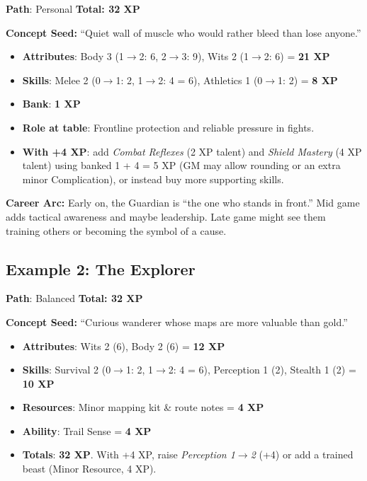 \textbf{Path}: Personal \quad \textbf{Total: 32 XP}

\medskip

\noindent\textbf{Concept Seed:} ``Quiet wall of muscle who would rather bleed than lose anyone.''

\begin{itemize}
\item \textbf{Attributes}: Body 3 (1\(\to\)2: 6, 2\(\to\)3: 9), Wits 2 (1\(\to\)2: 6) = \textbf{21 XP}
\item \textbf{Skills}: Melee 2 (0\(\to\)1: 2, 1\(\to\)2: 4 = 6), Athletics 1 (0\(\to\)1: 2) = \textbf{8 XP}
\item \textbf{Bank}: \textbf{1 XP}
\item \textbf{Role at table}: Frontline protection and reliable pressure in fights.
\item \textbf{With +4 XP}: add \emph{Combat Reflexes} (2 XP talent) and \emph{Shield Mastery} (4 XP talent) using banked 1 + 4 = 5 XP (GM may allow rounding or an extra minor Complication), or instead buy more supporting skills.
\end{itemize}

\noindent\textbf{Career Arc:} Early on, the Guardian is ``the one who stands in
front.'' Mid game adds tactical awareness and maybe leadership. Late game might
see them training others or becoming the symbol of a cause.

\subsection*{Example 2: The Explorer}
\label{sec:xp-ex-explorer}

\textbf{Path}: Balanced \quad \textbf{Total: 32 XP}

\medskip

\noindent\textbf{Concept Seed:} ``Curious wanderer whose maps are more valuable than gold.''

\begin{itemize}
\item \textbf{Attributes}: Wits 2 (6), Body 2 (6) = \textbf{12 XP}
\item \textbf{Skills}: Survival 2 (0\(\to\)1: 2, 1\(\to\)2: 4 = 6), Perception 1 (2), Stealth 1 (2) = \textbf{10 XP}
\item \textbf{Resources}: Minor mapping kit \& route notes = \textbf{4 XP}
\item \textbf{Ability}: Trail Sense = \textbf{4 XP}
\item \textbf{Totals}: \textbf{32 XP}. With +4 XP, raise \emph{Perception 1\(\to\)2} (+4) or add a trained beast (Minor Resource, 4 XP).
\end{itemize}

